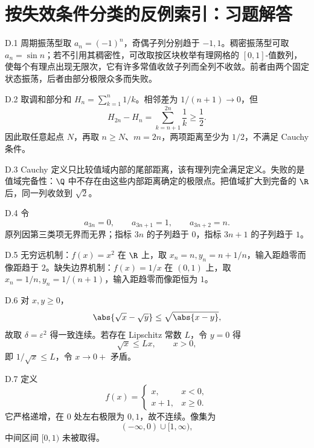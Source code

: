 \chapter{按失效条件分类的反例索引：习题解答}

\begin{solution}{D.1}
周期振荡型取 \(a_n=(-1)^n\)，奇偶子列分别趋于 \(-1,1\)。稠密振荡型可取 \(a_n=\sin n\)；若不引用其稠密性，可改取按区块枚举有理网格的 \([0,1]\)-值数列，使每个有理点出现无限次，它有许多常值收敛子列而全列不收敛。前者由两个固定状态振荡，后者由部分极限众多而失败。
\end{solution}

\begin{solution}{D.2}
取调和部分和 \(H_n=\sum_{k=1}^n1/k\)。相邻差为 \(1/(n+1)\to0\)，但
\[
 H_{2n}-H_n=\sum_{k=n+1}^{2n}\frac1k\ge\frac12.
\]
因此取任意起点 \(N\)，再取 \(n\ge N\)、\(m=2n\)，两项距离至少为 \(1/2\)，不满足 Cauchy 条件。
\end{solution}

\begin{solution}{D.3}
Cauchy 定义只比较值域内部的尾部距离，该有理列完全满足定义。失败的是值域完备性：\(\Q\) 中不存在由这些内部距离确定的极限点。把值域扩大到完备的 \(\R\) 后，同一列收敛到 \(\sqrt2\)。
\end{solution}

\begin{solution}{D.4}
令
\[
 a_{3n}=0,\qquad a_{3n+1}=1,\qquad a_{3n+2}=n.
\]
原列因第三类项无界而无界；指标 \(3n\) 的子列趋于 \(0\)，指标 \(3n+1\) 的子列趋于 \(1\)。
\end{solution}

\begin{solution}{D.5}
无穷远机制：\(f(x)=x^2\) 在 \(\R\) 上，取 \(x_n=n,y_n=n+1/n\)，输入距趋零而像距趋于 \(2\)。缺失边界机制：\(f(x)=1/x\) 在 \((0,1)\) 上，取 \(x_n=1/n,y_n=1/(n+1)\)，输入距趋零而像距恒为 \(1\)。
\end{solution}

\begin{solution}{D.6}
对 \(x,y\ge0\)，
\[
 \abs{\sqrt x-\sqrt y}\le\sqrt{\abs{x-y}},
\]
故取 \(\delta=\varepsilon^2\) 得一致连续。若存在 Lipschitz 常数 \(L\)，令 \(y=0\) 得
\[
 \sqrt x\le Lx,\qquad x>0,
\]
即 \(1/\sqrt x\le L\)，令 \(x\to0+\) 矛盾。
\end{solution}

\begin{solution}{D.7}
定义
\[
 f(x)=
 \begin{cases}
 x,&x<0,\\
 x+1,&x\ge0.
 \end{cases}
\]
它严格递增，在 \(0\) 处左右极限为 \(0,1\)，故不连续。像集为
\[
 (-\infty,0)\cup[1,\infty),
\]
中间区间 \([0,1)\) 未被取得。
\end{solution}

